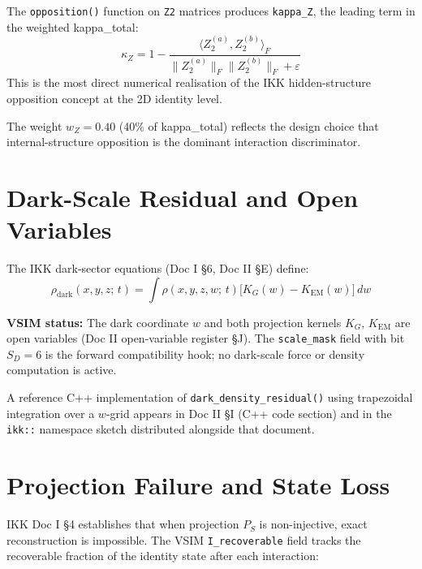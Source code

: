 \documentclass[11pt, a4paper, oneside]{article}
\theoremstyle{definition}
\theoremstyle{remark}
\begin{document}
The \texttt{opposition()} function on \texttt{Z2} matrices produces
\texttt{kappa\_Z}, the leading term in the weighted kappa\_total:
\begin{equation}
  \kappa_Z = 1 - \frac{\langle Z_2^{(a)}, Z_2^{(b)}\rangle_F}
					  {\|Z_2^{(a)}\|_F \|Z_2^{(b)}\|_F + \varepsilon}
\end{equation}
This is the most direct numerical realisation of the IKK hidden-structure
opposition concept at the 2D identity level.

The weight $w_Z = 0.40$ (40\% of kappa\_total) reflects the design choice
that internal-structure opposition is the dominant interaction discriminator.

\section{Dark-Scale Residual and Open Variables}

The IKK dark-sector equations (Doc I \S6, Doc II \S E) define:
\begin{equation}
  \rho_\text{dark}(x,y,z;\,t)
  = \int \rho(x,y,z,w;\,t)
	\bigl[K_G(w) - K_\text{EM}(w)\bigr]\, dw
\end{equation}

\textbf{VSIM status:} The dark coordinate $w$ and both projection kernels
$K_G$, $K_\text{EM}$ are open variables (Doc II open-variable register
\S J).  The \texttt{scale\_mask} field with bit $S_D = 6$ is the forward
compatibility hook; no dark-scale force or density computation is active.

A reference C++ implementation of \texttt{dark\_density\_residual()} using
trapezoidal integration over a $w$-grid appears in Doc II \S I (C++ code
section) and in the \texttt{ikk::} namespace sketch distributed alongside
that document.

\section{Projection Failure and State Loss}

IKK Doc I \S4 establishes that when projection $P_S$ is non-injective,
exact reconstruction is impossible.  The VSIM \texttt{I\_recoverable} field
tracks the recoverable fraction of the identity state after each interaction:
\end{document}

